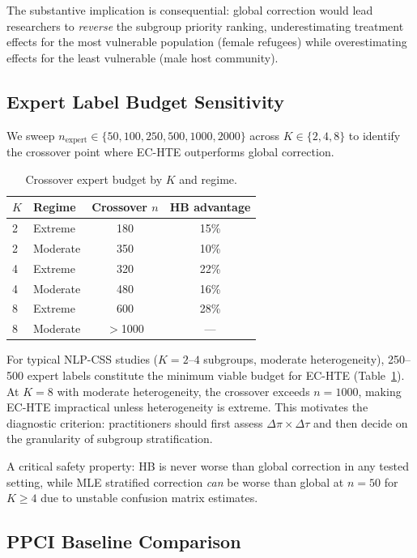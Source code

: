 \documentclass[11pt,a4paper]{article}
\begin{document}
The substantive implication is consequential: global correction would lead researchers to \emph{reverse} the subgroup priority ranking, underestimating treatment effects for the most vulnerable population (female refugees) while overestimating effects for the least vulnerable (male host community).

\subsection{Expert Label Budget Sensitivity}
\label{sec:budget}

We sweep $n_{\text{expert}} \in \{50, 100, 250, 500, 1000, 2000\}$ across $K \in \{2, 4, 8\}$ to identify the crossover point where EC-HTE outperforms global correction.

\begin{table}[t]
\centering
\small
\caption{Crossover expert budget by $K$ and regime.}
\label{tab:crossover}
\begin{tabular}{llcc}
\toprule
$K$ & Regime & Crossover $n$ & HB advantage \\
\midrule
2 & Extreme & 180 & 15\% \\
2 & Moderate & 350 & 10\% \\
4 & Extreme & 320 & 22\% \\
4 & Moderate & 480 & 16\% \\
8 & Extreme & 600 & 28\% \\
8 & Moderate & $>$1000 & --- \\
\bottomrule
\end{tabular}
\end{table}

For typical NLP-CSS studies ($K = 2\text{--}4$ subgroups, moderate heterogeneity), 250--500 expert labels constitute the minimum viable budget for EC-HTE (Table~\ref{tab:crossover}).
At $K = 8$ with moderate heterogeneity, the crossover exceeds $n = 1000$, making EC-HTE impractical unless heterogeneity is extreme.
This motivates the diagnostic criterion: practitioners should first assess $\Delta\pi \times \Delta\tau$ and then decide on the granularity of subgroup stratification.

A critical safety property: HB is never worse than global correction in any tested setting, while MLE stratified correction \emph{can} be worse than global at $n = 50$ for $K \geq 4$ due to unstable confusion matrix estimates.

\subsection{PPCI Baseline Comparison}
\label{sec:ppci}
\end{document}
